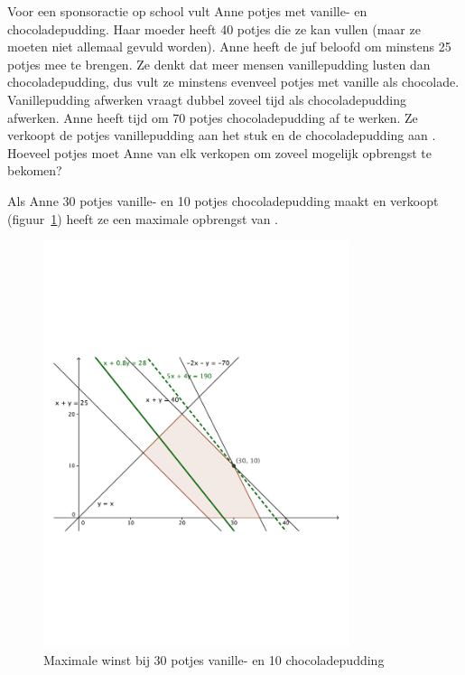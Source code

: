 \begin{oef}
Voor een sponsoractie op school vult Anne potjes met vanille- en chocoladepudding. 
Haar moeder heeft 40 potjes die ze kan vullen 
(maar ze moeten niet allemaal gevuld worden).
Anne heeft de juf beloofd om minstens 25 potjes mee te brengen.
Ze denkt dat meer mensen vanillepudding lusten dan chocoladepudding,
dus vult ze minstens evenveel potjes met vanille als chocolade.
Vanillepudding afwerken vraagt dubbel zoveel tijd als chocoladepudding
afwerken. Anne heeft tijd om 70 potjes chocoladepudding af te werken.
Ze verkoopt de potjes vanillepudding aan  het stuk en de 
chocoladepudding aan .
Hoeveel potjes moet Anne van elk verkopen om zoveel mogelijk
opbrengst te bekomen? 
\begin{opl}
Als Anne 30 potjes vanille- en 10 potjes chocoladepudding maakt en verkoopt (figuur~\ref{fig:pudding}) heeft ze een maximale opbrengst van .
\begin{figure}[hbtp]
\centering
\includegraphics[width=0.8\textwidth]{oefeningen/FigurenLP/Oefpudding.pdf}
\caption{Maximale winst bij 30 potjes vanille- en 10 chocoladepudding}
\label{fig:pudding}
\end{figure}
\end{opl}
\end{oef}


